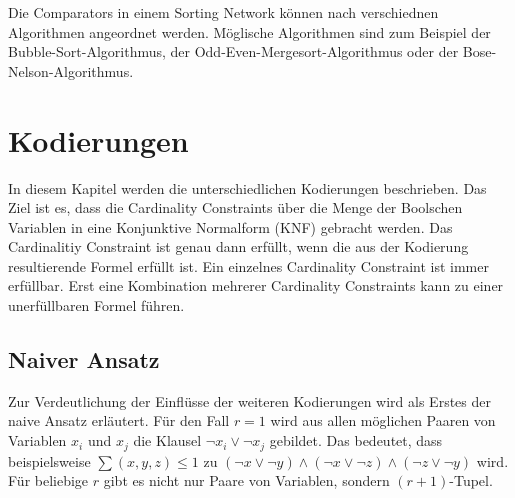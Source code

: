 \documentclass[a4,abstract=on]{scrartcl}
\newcommand*\stdsection{}
\let\stdsection\section
\renewcommand*\section{%
    \clearpage\ifodd\value{page}\else\mbox{}\clearpage\fi
    \stdsection}
\begin{document}
Die Comparators in einem Sorting Network können nach verschiednen Algorithmen angeordnet werden. Möglische Algorithmen sind zum Beispiel der Bubble-Sort-Algorithmus, der Odd-Even-Mergesort-Algorithmus oder der Bose-Nelson-Algorithmus.

\section{Kodierungen}
In diesem Kapitel werden die unterschiedlichen Kodierungen beschrieben. Das Ziel ist es, dass die Cardinality Constraints über die Menge der Boolschen Variablen in eine Konjunktive Normalform (KNF) gebracht werden. %
Das Cardinalitiy Constraint ist genau dann erfüllt, wenn die aus der Kodierung resultierende Formel erfüllt ist. Ein einzelnes Cardinality Constraint ist immer erfüllbar. Erst eine Kombination mehrerer Cardinality Constraints kann zu einer unerfüllbaren Formel führen.


	\subsection{Naiver Ansatz}
Zur Verdeutlichung der Einflüsse der weiteren Kodierungen wird als Erstes der naive Ansatz erläutert. Für den Fall $r=1$ wird aus allen möglichen Paaren von Variablen $x_i$ und $x_j$ die Klausel $\neg x_i \vee \neg x_j$ gebildet. Das bedeutet, dass beispielsweise $\sum(x,y,z)\leq1$ zu $(\neg x \vee \neg y) \wedge (\neg x \vee \neg z) \wedge (\neg z \vee \neg y)$ wird.
Für beliebige $r$ gibt es nicht nur Paare von Variablen, sondern $(r+1)$-Tupel.\\

\end{document}
